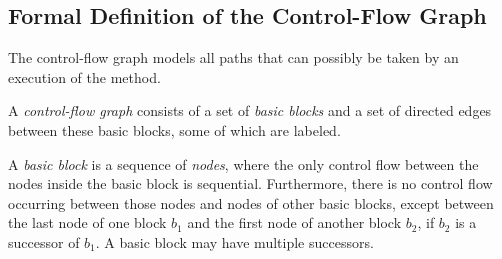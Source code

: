 \subsection{Formal Definition of the Control-Flow Graph}
\label{sec:cfg-formal}

The control-flow graph models all paths that can possibly be taken by an
execution of the method.

\begin{definition}
    A \emph{control-flow graph} consists of a set of \emph{basic
      blocks} and a set of directed edges between these basic blocks,
    some of which are labeled.
\end{definition}

\begin{definition}
    A \emph{basic block} is a sequence of \emph{nodes}, where the only
    control flow between the nodes inside
    the basic block is sequential.  Furthermore, there is no
    control flow occurring between those nodes and nodes of other basic
    blocks, except between the last node of one block $b_1$ and the first node
    of another block $b_2$, if $b_2$ is a successor of $b_1$.  A basic
    block may have multiple successors.
\end{definition}




